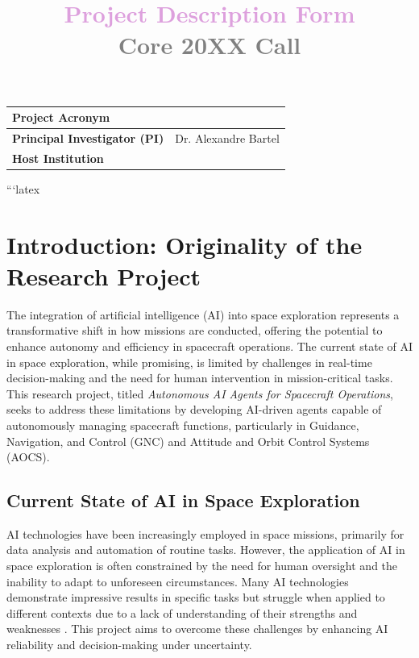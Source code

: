 \documentclass[a4paper, 11pt]{article}
\title{\bf \textcolor{Plum}{Project Description Form} \\ \textcolor{Gray}{Core 20XX Call}}
\author{\vspace{-5ex}}
\date{\vspace{-5ex}}
\begin{document}
\vspace{10cm}
\maketitle

\begin{center}
\begin{tabular}{|p{4.5cm}|p{}|}
\hline
\bf Project Acronym  &  \\ \hline
\bf Principal Investigator (PI)  &  Dr. Alexandre Bartel \\ \hline
\bf Host Institution  & \\ \hline
\end{tabular}
\end{center}

\newpage
```latex
\section{Introduction: Originality of the Research Project}

The integration of artificial intelligence (AI) into space exploration represents a transformative shift in how missions are conducted, offering the potential to enhance autonomy and efficiency in spacecraft operations. The current state of AI in space exploration, while promising, is limited by challenges in real-time decision-making and the need for human intervention in mission-critical tasks. This research project, titled \textit{Autonomous AI Agents for Spacecraft Operations}, seeks to address these limitations by developing AI-driven agents capable of autonomously managing spacecraft functions, particularly in Guidance, Navigation, and Control (GNC) and Attitude and Orbit Control Systems (AOCS).

\subsection{Current State of AI in Space Exploration}

AI technologies have been increasingly employed in space missions, primarily for data analysis and automation of routine tasks. However, the application of AI in space exploration is often constrained by the need for human oversight and the inability to adapt to unforeseen circumstances. Many AI technologies demonstrate impressive results in specific tasks but struggle when applied to different contexts due to a lack of understanding of their strengths and weaknesses \cite{AI_transferability}. This project aims to overcome these challenges by enhancing AI reliability and decision-making under uncertainty.
\end{document}
